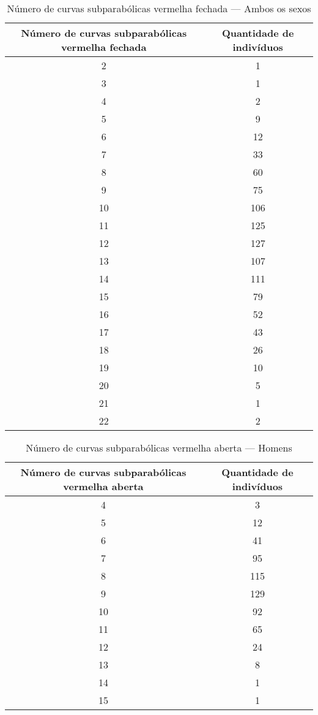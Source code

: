 \documentclass[a4paper,12pt]{article}
\begin{document}
\begin{table}[h!]
\centering
\caption{Número de curvas subparabólicas vermelha fechada — Ambos os sexos}
\begin{tabular}{c c}
\hline
\textbf{Número de curvas subparabólicas vermelha fechada} & \textbf{Quantidade de indivíduos} \\ 
\hline
2  & 1  \\
3  & 1  \\
4  & 2  \\
5  & 9  \\
6  & 12 \\
7  & 33 \\
8  & 60 \\
9  & 75 \\
10 & 106 \\
11 & 125 \\
12 & 127 \\
13 & 107 \\
14 & 111 \\
15 & 79 \\
16 & 52 \\
17 & 43 \\
18 & 26 \\
19 & 10 \\
20 & 5  \\
21 & 1  \\
22 & 2  \\
\hline
\end{tabular}
\end{table}


\begin{table}[h!]
\centering
\caption{Número de curvas subparabólicas vermelha aberta — Homens}
\begin{tabular}{c c}
\hline
\textbf{Número de curvas subparabólicas vermelha aberta} & \textbf{Quantidade de indivíduos} \\ 
\hline
4  & 3  \\
5  & 12 \\
6  & 41 \\
7  & 95 \\
8  & 115 \\
9  & 129 \\
10 & 92 \\
11 & 65 \\
12 & 24 \\
13 & 8  \\
14 & 1  \\
15 & 1  \\
\hline
\end{tabular}
\end{table}
\end{document}
